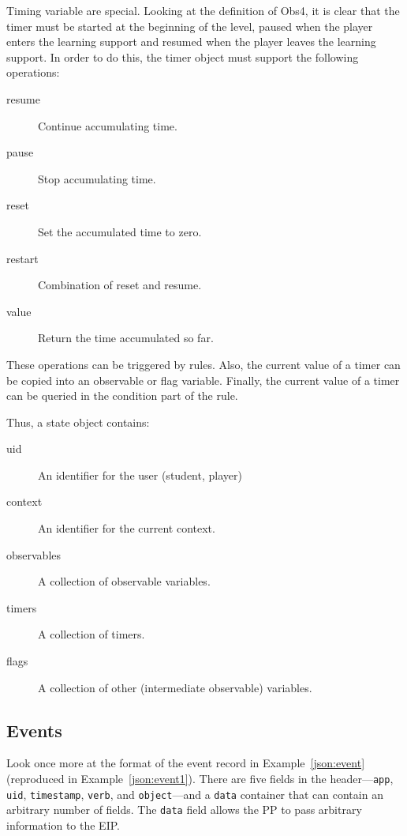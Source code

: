 \documentclass{article}
\begin{document}
  Timing variable are special.  Looking at the definition of Obs4, it
  is clear that the timer must be started at the beginning of the
  level, paused when the player enters the learning support and resumed
  when the player leaves the learning support.  In order to do this,
  the timer object must support the following operations:
  \begin{description}
  \item[resume]{Continue accumulating time.}
  \item[pause]{Stop accumulating time.}
  \item[reset]{Set the accumulated time to zero.}
  \item[restart]{Combination of reset and resume.}
  \item[value]{Return the time accumulated so far.}
  \end{description}

  These operations can be triggered by rules.  Also, the current value
  of a timer can be copied into an observable or flag variable.
  Finally, the current value of a timer can be queried in the
  condition part of the rule.

  Thus, a state object contains:
  \begin{description}
  \item[uid]{An identifier for the user (student, player)}
  \item[context]{An identifier for the current context.}
  \item[observables]{A collection of observable variables.}
  \item[timers]{A collection of timers.}
  \item[flags]{A collection of other (intermediate observable)
    variables.}
  \end{description}
  

  \subsection{Events}
  \label{sub:events}

  Look once more at the format of the event record in
  Example~\ref{json:event} (reproduced in Example~\ref{json:event1}).
  There are five fields in the header---\texttt{app}, \texttt{uid},
  \texttt{timestamp}, \texttt{verb}, and \texttt{object}---and a
  \texttt{data} container that can contain an arbitrary number of
  fields.  The \texttt{data} field allows the PP to pass arbitrary
  information to the EIP.
\end{document}
